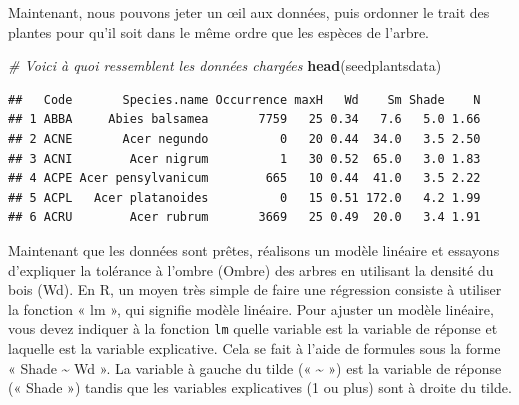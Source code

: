 \documentclass[
]{book}
\newenvironment{Shaded}{\begin{snugshade}}{\end{snugshade}}
\newcommand{\CommentTok}[1]{\textcolor[rgb]{0.56,0.35,0.01}{\textit{#1}}}
\newcommand{\FunctionTok}[1]{\textcolor[rgb]{0.13,0.29,0.53}{\textbf{#1}}}
\newcommand{\NormalTok}[1]{#1}
\newcommand{\OtherTok}[1]{\textcolor[rgb]{0.56,0.35,0.01}{#1}}
\newcommand{\SpecialCharTok}[1]{\textcolor[rgb]{0.81,0.36,0.00}{\textbf{#1}}}
\begin{document}
Maintenant, nous pouvons jeter un œil aux données, puis ordonner le trait des plantes pour qu'il soit dans le même ordre que les espèces de l'arbre.

\begin{Shaded}
\begin{Highlighting}[]
\CommentTok{\# Voici à quoi ressemblent les données chargées}
\FunctionTok{head}\NormalTok{(seedplantsdata)}
\end{Highlighting}
\end{Shaded}

\begin{verbatim}
##   Code       Species.name Occurrence maxH   Wd    Sm Shade    N
## 1 ABBA     Abies balsamea       7759   25 0.34   7.6   5.0 1.66
## 2 ACNE       Acer negundo          0   20 0.44  34.0   3.5 2.50
## 3 ACNI        Acer nigrum          1   30 0.52  65.0   3.0 1.83
## 4 ACPE Acer pensylvanicum        665   10 0.44  41.0   3.5 2.22
## 5 ACPL   Acer platanoides          0   15 0.51 172.0   4.2 1.99
## 6 ACRU        Acer rubrum       3669   25 0.49  20.0   3.4 1.91
\end{verbatim}

\begin{Shaded}
\end{Shaded}

Maintenant que les données sont prêtes, réalisons un modèle linéaire et essayons d'expliquer la tolérance à l'ombre (Ombre) des arbres en utilisant la densité du bois (Wd). En R, un moyen très simple de faire une régression consiste à utiliser la fonction « lm », qui signifie modèle linéaire. Pour ajuster un modèle linéaire, vous devez indiquer à la fonction \texttt{lm} quelle variable est la variable de réponse et laquelle est la variable explicative. Cela se fait à l'aide de formules sous la forme « Shade \textasciitilde{} Wd ». La variable à gauche du tilde (« \textasciitilde{} ») est la variable de réponse (« Shade ») tandis que les variables explicatives (1 ou plus) sont à droite du tilde.
\end{document}
